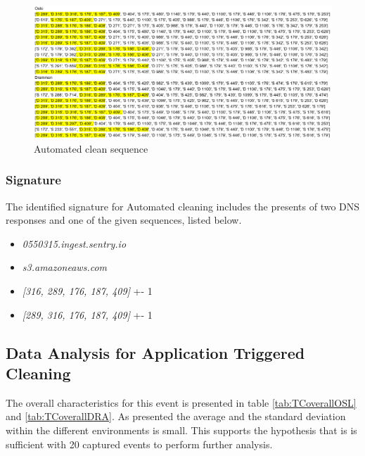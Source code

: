 \begin{figure}[H]
    \centering
    \includegraphics[width=\textwidth]{figures/Sequence_AC.png}
    \caption{Automated clean sequence}
    \label{fig:ACseq}
\end{figure}


\subsubsection{Signature}
The identified signature for Automated cleaning includes the presents of two DNS responses and one of the given sequences, listed below.  

\begin{itemize}
    \item \textit{0550315.ingest.sentry.io}
    \item \textit{s3.amazoneaws.com}
    \item \textit{[316, 289, 176, 187, 409]} +- 1
    \item \textit{[289, 316, 176, 187, 409]} +- 1
\end{itemize}


\subsection{Data Analysis for Application Triggered Cleaning}
The overall characteristics for this event is presented in table \ref{tab:TCoverallOSL} and \ref{tab:TCoverallDRA}. As presented the average and the standard deviation within the different environments is small. This supports the hypothesis that is is sufficient with 20 captured events to perform further analysis.


